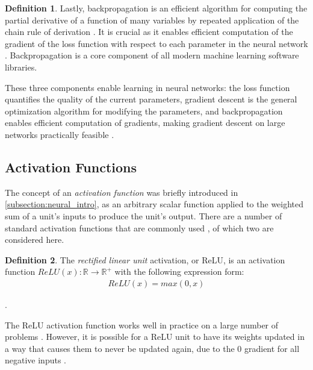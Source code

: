 \documentclass[12pt, titlepage]{report}
\theoremstyle{definition}
\newtheorem{definition}{Definition}
\begin{document}
\begin{definition}
Lastly, backpropagation is an efficient algorithm for computing the partial derivative of a function of many variables by repeated application of the chain rule of derivation \cite[Backpropagation, Intuitions]{karpathy2017cs231n}. It is crucial as it enables efficient computation of the gradient of the loss function with respect to each parameter in the neural network \cite[Backpropagation, Intuitions]{karpathy2017cs231n}. Backpropagation is a core component of all modern machine learning software libraries.
\end{definition}

These three components enable learning in neural networks: the loss function quantifies the quality of the current parameters, gradient descent is the general optimization algorithm for modifying the parameters, and backpropagation enables efficient computation of gradients, making gradient descent on large networks practically feasible \cite[Optimization: Stochastic Gradient Descent]{karpathy2017cs231n}.



\subsection{Activation Functions}
The concept of an \emph{activation function} was briefly introduced in \ref{subsection:neural_intro}, as an arbitrary scalar function applied to the weighted sum of a unit's inputs to produce the unit's output. There are a number of standard activation functions that are commonly used \cite[Neural Networks Part 1: Setting up the Architecture]{karpathy2017cs231n}, of which two are considered here.

\begin{definition}
The \emph{rectified linear unit} activation, or ReLU, is an activation function $ReLU(x) : \mathbb{R} \rightarrow \mathbb{R}^{+}$ with the following expression form:
\begin{gather}\label{eq:relu}
ReLU(x) = max(0, x)
\end{gather}
\end{definition}.

The ReLU activation function works well in practice on a large number of problems \cite[Neural Networks Part 1: Setting up the Architecture]{karpathy2017cs231n}. However, it is possible for a ReLU unit to have its weights updated in a way that causes them to never be updated again, due to the 0 gradient for all negative inputs \cite[Neural Networks Part 1: Setting up the Architecture]{karpathy2017cs231n}. 
\end{document}
